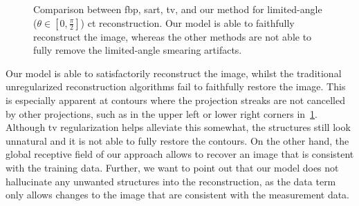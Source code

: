 \documentclass[../ml-ct.tex]{subfiles}
\begin{document}
\begin{figure}
	\centering
	\caption[Qualitative results for limited-angle reconstruction.]{%
		Comparison between \gls{fbp}, \gls{sart}, \gls{tv}, and our method for limited-angle (\(\theta \in [0, \frac{\pi}{2}]\)) \gls{ct} reconstruction.
		Our model is able to faithfully reconstruct the image, whereas the other methods are not able to fully remove the limited-angle smearing artifacts.
	}%
	\label{fig:experiments:limited-angle}
\end{figure}

Our model is able to satisfactorily reconstruct the image, whilst the traditional unregularized reconstruction algorithms fail to faithfully restore the image.
This is especially apparent at contours where the projection streaks are not cancelled by other projections, such as in the upper left or lower right corners in~\cref{fig:experiments:limited-angle}.
Although \gls{tv} regularization helps alleviate this somewhat, the structures still look unnatural and it is not able to fully restore the contours.
On the other hand, the global receptive field of our approach allows to recover an image that is consistent with the training data.
Further, we want to point out that our model does not hallucinate any unwanted structures into the reconstruction, as the data term only allows changes to the image that are consistent with the measurement data.
\end{document}
